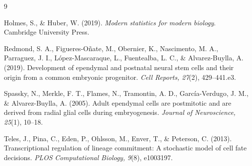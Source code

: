 \documentclass[12pt]{article}
\begin{document}
\begin{thebibliography}{9}

Holmes, S., \& Huber, W. (2019).
\textit{Modern statistics for modern biology}.
Cambridge University Press.

Redmond, S. A., Figueres-O\~{n}ate, M., Obernier, K., Nascimento, M. A., Parraguez, J. I., L\'{o}pez-Mascaraque, L., Fuentealba, L. C., \& Alvarez-Buylla, A. (2019).
Development of ependymal and postnatal neural stem cells and their origin from a common embryonic progenitor.
\textit{Cell Reports, 27}(2), 429--441.e3.

Spassky, N., Merkle, F. T., Flames, N., Tramontin, A. D., Garc\'{i}a-Verdugo, J. M., \& Alvarez-Buylla, A. (2005).
Adult ependymal cells are postmitotic and are derived from radial glial cells during embryogenesis.
\textit{Journal of Neuroscience, 25}(1), 10--18.

Teles, J., Pina, C., Eden, P., Ohlsson, M., Enver, T., \& Peterson, C. (2013).
Transcriptional regulation of lineage commitment: A stochastic model of cell fate decisions.
\textit{PLOS Computational Biology, 9}(8), e1003197.

\end{thebibliography}
\end{document}
